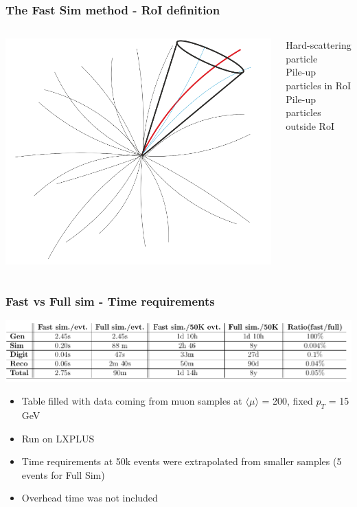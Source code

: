 \documentclass{beamer}
\begin{document}

\begin{frame}
\frametitle{The Fast Sim method - RoI definition}

\begin{columns}[t]
	\begin{column}{.7\textwidth}
		\includegraphics[width=\textwidth,valign=T]{cone}
	\end{column}
	\begin{column}{.3\textwidth}
		
		\small
		{\color{red} Hard-scattering particle} \\
		\vskip0.8cm
		{\color{cyan} Pile-up particles in RoI} \\
		\vskip0.8cm
		{\color{gray} Pile-up particles outside RoI} \\
		\vskip1.5cm
	\end{column}
\end{columns}
	
\end{frame}

\begin{frame}
\frametitle{Fast vs Full sim - Time requirements}
\includegraphics[width=\textwidth]{time}

\begin{itemize}
\item Table filled with data coming from muon samples at $\langle\mu\rangle$ = 200, fixed $p_{T}$ = 15 GeV
\item Run on LXPLUS
\item Time requirements at 50k events were extrapolated from smaller samples (5 events for Full Sim)
\item Overhead time was not included
\end{itemize}
\end{frame}
\end{document}
